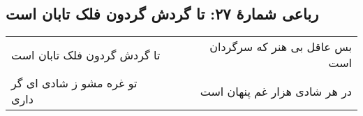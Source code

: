 \begin{center}
\section*{رباعی شمارهٔ ۲۷: تا گردش گردون فلک تابان است}
\label{sec:027}
\begin{longtable}{l p{0.5cm} r}
تا گردش گردون فلک تابان است
&&
بس عاقل بی هنر که سرگردان است
\\
تو غره مشو ز شادی ای گر داری
&&
در هر شادی هزار  غم پنهان است
\\
\end{longtable}
\end{center}
